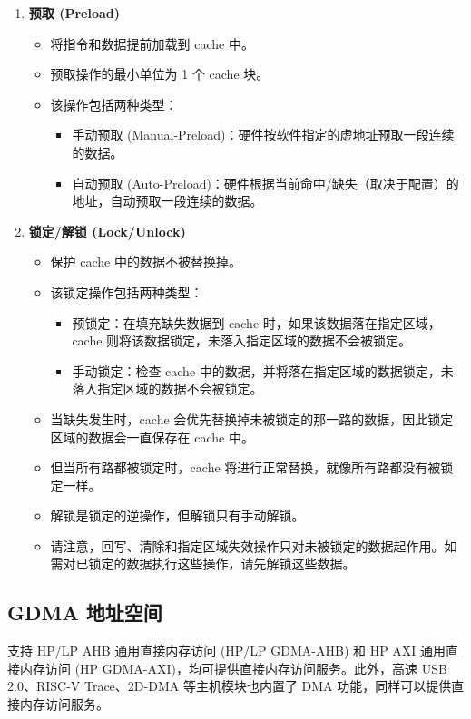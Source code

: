 \documentclass[main\_\_CN.tex]{subfiles}
\begin{document}
\begin{enumerate}
\item \textbf{预取 (Preload)}
\begin{itemize}
    \item 将指令和数据提前加载到 cache 中。
    \item 预取操作的最小单位为 1 个 cache 块。
    \item 该操作包括两种类型：
    \begin{itemize}
    \item 手动预取 (Manual-Preload)：硬件按软件指定的虚地址预取一段连续的数据。
    \item 自动预取 (Auto-Preload)：硬件根据当前命中/缺失（取决于配置）的地址，自动预取一段连续的数据。
    \end{itemize}
\end{itemize}

\item \textbf{锁定/解锁 (Lock/Unlock)}
\begin{itemize}
    \item 保护 cache 中的数据不被替换掉。
    \item 该锁定操作包括两种类型：
    \begin{itemize}
    \item 预锁定：在填充缺失数据到 cache 时，如果该数据落在指定区域，cache 则将该数据锁定，未落入指定区域的数据不会被锁定。
    \item 手动锁定：检查 cache 中的数据，并将落在指定区域的数据锁定，未落入指定区域的数据不会被锁定。
    \end{itemize}
    \item 当缺失发生时，cache 会优先替换掉未被锁定的那一路的数据，因此锁定区域的数据会一直保存在 cache 中。
    \item 但当所有路都被锁定时，cache 将进行正常替换，就像所有路都没有被锁定一样。
    \item 解锁是锁定的逆操作，但解锁只有手动解锁。
    \item 请注意，回写、清除和指定区域失效操作只对未被锁定的数据起作用。如需对已锁定的数据执行这些操作，请先解锁这些数据。

\end{itemize}
\end{enumerate}


\subsection{GDMA 地址空间}

\chipname{} 支持 HP/LP AHB 通用直接内存访问 (HP/LP GDMA-AHB) 和 HP AXI 通用直接内存访问 (HP GDMA-AXI)，均可提供直接内存访问服务。此外，高速 USB 2.0、RISC-V Trace、2D-DMA 等主机模块也内置了 DMA 功能，同样可以提供直接内存访问服务。
\end{document}
